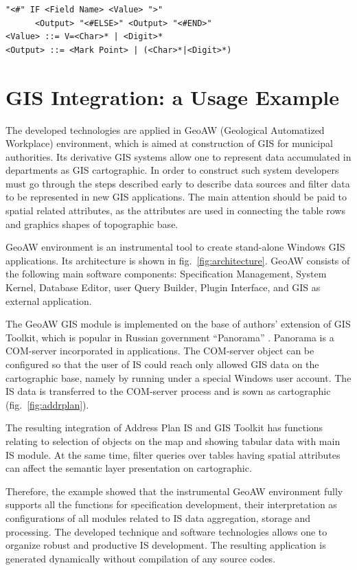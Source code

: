 \documentclass[conference]{IEEEtran}
\begin{document}
\begin{lstlisting}
"<#" IF <Field Name> <Value> ">"
      <Output> "<#ELSE>" <Output> "<#END>"
<Value> ::= V=<Char>* | <Digit>*
<Output> ::= <Mark Point> | (<Char>*|<Digit>*)
\end{lstlisting}


\section{GIS Integration: a Usage Example}
\label{sec:gis-integration}

The developed technologies are applied in GeoAW (Geological Automatized Workplace) environment, which is aimed at construction of GIS for municipal authorities.  Its derivative GIS systems allow one to represent data accumulated in departments as GIS cartographic.  In order to construct such system developers must go through the steps described early to describe data sources and filter data to be represented in new GIS applications.  The main attention should be paid to spatial related attributes, as the attributes are used in connecting the table rows and graphics shapes of topographic base.

GeoAW environment is an instrumental tool to create stand-alone Windows GIS applications.  Its architecture is shown in fig.~\ref{fig:architecture}.  GeoAW consists of the following main software components: Specification Management,  System Kernel, Database Editor, user Query Builder, Plugin Interface, and GIS as external application.

The GeoAW GIS module is implemented on the base of authors' extension of GIS Toolkit, which is popular in Russian government  ``Panorama'' \cite{b42}. Panorama is a COM-server incorporated in applications.  The COM-server object can be configured so that the user of IS could reach only allowed GIS data on the cartographic base, namely by running under a special Windows user account.  The IS data is transferred to the COM-server process and is sown as cartographic (fig.~\ref{fig:addrplan}).

The resulting integration of Address Plan IS and GIS Toolkit has functions relating to selection of objects on the map and showing tabular data with main IS module.  At the same time, filter queries over tables having spatial attributes can affect the semantic layer presentation on cartographic.

Therefore, the example showed that the instrumental GeoAW environment fully supports all the functions for specification development, their interpretation as configurations of all modules related to IS data aggregation, storage and processing.  The developed technique and software technologies allows one to organize robust and productive IS development.  The resulting application is generated dynamically without compilation of any source codes.
\end{document}
